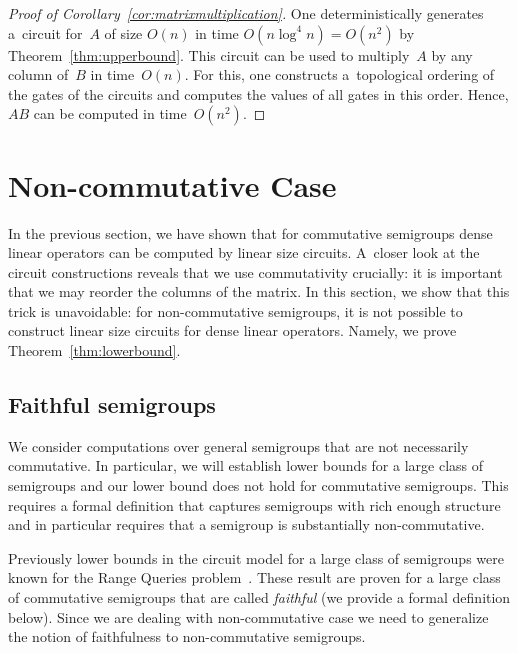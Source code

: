 \documentclass[a4paper,UKenglish,cleveref, autoref]{lipics-v2019}
\begin{document}
\begin{proof}[Proof of Corollary~\ref{cor:matrixmultiplication}]
One deterministically generates a~circuit for~$A$ of size $O(n)$ in time $O(n\log^4n)=O(n^2)$ by Theorem~\ref{thm:upperbound}.
This circuit can be used to multiply~$A$ by any column of~$B$
in time~$O(n)$. For this, one constructs a~topological ordering of the gates of the circuits and computes the values of all gates in
this order. Hence, $AB$ can be computed in time~$O(n^2)$.
\end{proof}


\section{Non-commutative Case}\label{sec-non-commutative}

In the previous section, we have shown that for commutative semigroups dense linear operators can be computed by linear size circuits. A~closer look at the circuit constructions reveals that we use commutativity crucially: it is important that we may reorder the columns of the matrix. In this section, we show that this trick is unavoidable: for non-commutative semigroups, it is not possible to construct linear size circuits for dense linear operators. Namely, we prove Theorem~\ref{thm:lowerbound}.

\lowerthm*

\subsection{Faithful semigroups}

We consider computations over general semigroups that are not necessarily commutative. In particular, we will establish lower bounds for a large class of semigroups and our lower bound does not hold for commutative semigroups. This requires a formal definition that captures semigroups with rich enough structure and in particular requires that a semigroup is substantially non-commutative.

Previously lower bounds in the circuit model for a large class of semigroups were known for the Range Queries problem~\cite{DBLP:conf/stoc/Yao82,DBLP:journals/ijcga/ChazelleR91}. These result are proven for a large class of commutative semigroups that are called \emph{faithful} (we provide a formal definition below). Since we are dealing with non-commutative case we need to generalize the notion of faithfulness to non-commutative semigroups.
\end{document}
